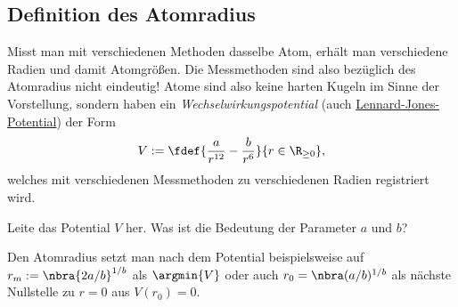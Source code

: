 \documentclass{subfiles}
\begin{document}
        \subsection{Definition des Atomradius}
            Misst man mit verschiedenen Methoden dasselbe Atom, erhält man verschiedene Radien und damit Atomgrößen. Die Messmethoden sind also bezüglich des Atomradius nicht eindeutig! Atome sind also keine harten Kugeln im Sinne der Vorstellung, sondern haben ein \emph{Wechselwirkungspotential} (auch \href{https://de.wikipedia.org/wiki/Lennard-Jones-Potential}{Lennard-Jones-Potential}) der Form 
            \[V:=\fdef{\frac{a}{r^{12}}-\frac{b}{r^6}}{r\in\R_{\geq 0}},\]
            welches mit verschiedenen Messmethoden zu verschiedenen Radien registriert wird. 
            \begin{Aufgabe}
                \nr{} Leite das Potential $V$ her. Was ist die Bedeutung der Parameter $a$ und $b$?
            \end{Aufgabe}
            Den Atomradius setzt man nach dem Potential beispielsweise auf $r_m:=\nbra{2a/b}^{1/b}$ als $\argmin{V}$ oder auch $r_0=\nbra(a/b)^{1/b}$ als nächste Nullstelle zu $r=0$ aus $V(r_0)=0$. 
            
\end{document}
